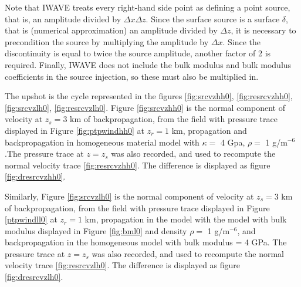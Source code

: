 Note that IWAVE treats every right-hand side point as defining a point source, that is, an amplitude divided by $\Delta x \Delta z$. Since the surface source is a surface $\delta$, that is (numerical approximation) an amplitude divided by $\Delta z$, it is necessary to precondition the source by multiplying the amplitude by $\Delta x$. Since the discontinuity is equal to twice the source amplitude, another factor of 2 is required. Finally, IWAVE does not include the bulk modulus and bulk modulus coefficients in the source injection, so these must also be multiplied in.

The upshot is the cycle represented in the figures \ref{fig:srcvzhh0},  \ref{fig:resrcvzhh0}, \ref{fig:srcvzlh0},  \ref{fig:resrcvzlh0}. Figure \ref{fig:srcvzhh0} is the normal component of velocity at $z_s=3$ km of backpropagation, from the field with pressure trace displayed in Figure \ref{fig:ptpwindhh0} at $z_r=1$ km, propagation and backpropagation in homogeneous material model with $\kappa = $ 4 Gpa, $\rho = $ 1 g/m$^{-6}$.The pressure trace at $z=z_s$ was also recorded, and used to recompute the normal velocity trace \ref{fig:resrcvzhh0}. The difference is displayed as figure \ref{fig:dresrcvzhh0}.

Similarly, Figure \ref{fig:srcvzlh0} is the normal component of velocity at $z_s=3$ km of backpropagation, from the field with pressure trace displayed in Figure \ref{ptpwindll0} at $z_r=1$ km, propagation in the model with the model with bulk modulus displayed in Figure \ref{fig:bml0} and density $\rho = $ 1 g/m$^{-6}$, and backpropagation in the homogeneous model with bulk modulus = 4 GPa. The pressure trace at $z=z_s$ was also recorded, and used to recompute the normal velocity trace \ref{fig:resrcvzlh0}. The difference is displayed as figure \ref{fig:dresrcvzlh0}.






